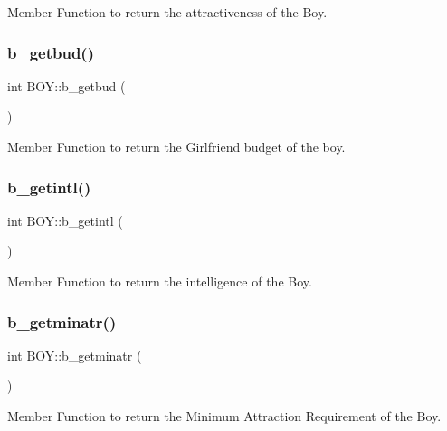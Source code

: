 Member Function to return the attractiveness of the Boy. 

\mbox{\label{class_b_o_y_aadf93fc608732bbe0f1d72711fc25a7f}} 
\subsubsection{\texorpdfstring{b\+\_\+getbud()}{b\_getbud()}}
{\footnotesize\ttfamily int B\+O\+Y\+::b\+\_\+getbud (\begin{DoxyParamCaption}{ }\end{DoxyParamCaption})}



Member Function to return the Girlfriend budget of the boy. 

\mbox{\label{class_b_o_y_ab9fa5b1b234e7dbecc6a03eb213cd49c}} 
\subsubsection{\texorpdfstring{b\+\_\+getintl()}{b\_getintl()}}
{\footnotesize\ttfamily int B\+O\+Y\+::b\+\_\+getintl (\begin{DoxyParamCaption}{ }\end{DoxyParamCaption})}



Member Function to return the intelligence of the Boy. 

\mbox{\label{class_b_o_y_ac1713c5815f12a9f8ef5387e7c87534a}} 
\subsubsection{\texorpdfstring{b\+\_\+getminatr()}{b\_getminatr()}}
{\footnotesize\ttfamily int B\+O\+Y\+::b\+\_\+getminatr (\begin{DoxyParamCaption}{ }\end{DoxyParamCaption})}



Member Function to return the Minimum Attraction Requirement of the Boy. 

\mbox{\label{class_b_o_y_a789052488ba219f52d427241268b3a98}} 
